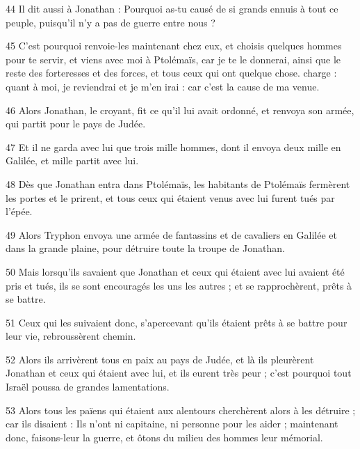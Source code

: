\par 44 Il dit aussi à Jonathan : Pourquoi as-tu causé de si grands ennuis à tout ce peuple, puisqu'il n'y a pas de guerre entre nous ?
\par 45 C'est pourquoi renvoie-les maintenant chez eux, et choisis quelques hommes pour te servir, et viens avec moi à Ptolémaïs, car je te le donnerai, ainsi que le reste des forteresses et des forces, et tous ceux qui ont quelque chose. charge : quant à moi, je reviendrai et je m'en irai : car c'est la cause de ma venue.
\par 46 Alors Jonathan, le croyant, fit ce qu'il lui avait ordonné, et renvoya son armée, qui partit pour le pays de Judée.
\par 47 Et il ne garda avec lui que trois mille hommes, dont il envoya deux mille en Galilée, et mille partit avec lui.
\par 48 Dès que Jonathan entra dans Ptolémaïs, les habitants de Ptolémaïs fermèrent les portes et le prirent, et tous ceux qui étaient venus avec lui furent tués par l'épée.
\par 49 Alors Tryphon envoya une armée de fantassins et de cavaliers en Galilée et dans la grande plaine, pour détruire toute la troupe de Jonathan.
\par 50 Mais lorsqu'ils savaient que Jonathan et ceux qui étaient avec lui avaient été pris et tués, ils se sont encouragés les uns les autres ; et se rapprochèrent, prêts à se battre.
\par 51 Ceux qui les suivaient donc, s'apercevant qu'ils étaient prêts à se battre pour leur vie, rebroussèrent chemin.
\par 52 Alors ils arrivèrent tous en paix au pays de Judée, et là ils pleurèrent Jonathan et ceux qui étaient avec lui, et ils eurent très peur ; c'est pourquoi tout Israël poussa de grandes lamentations.
\par 53 Alors tous les païens qui étaient aux alentours cherchèrent alors à les détruire ; car ils disaient : Ils n'ont ni capitaine, ni personne pour les aider ; maintenant donc, faisons-leur la guerre, et ôtons du milieu des hommes leur mémorial.


